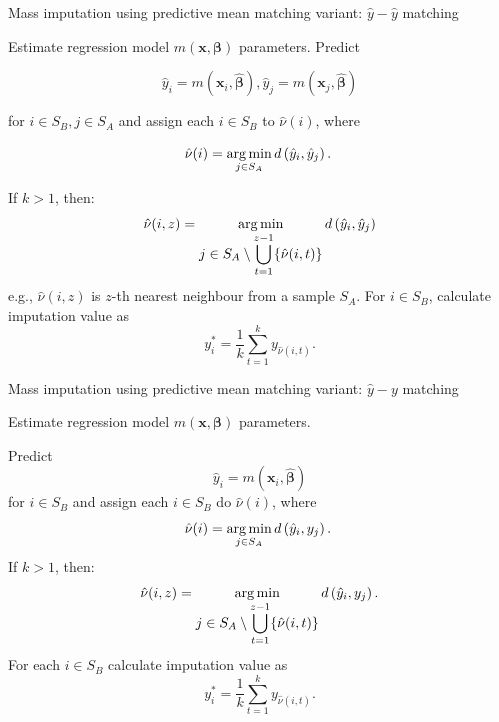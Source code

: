 \documentclass[
]{jss}
\begin{document}
\begin{algorithm}[ht!]
\caption{Mass imputation using predictive mean matching variant: $\hat{y}-\hat{y}$ matching}
\label{algo-3}
\begin{algorithmic}[1]
\State Estimate regression model $m(\boldsymbol{x}, \boldsymbol{\beta})$ parameters.\;
\State Predict 

$$\hat{y}_{i}=m\left(\boldsymbol{x}_{i},\hat{\boldsymbol{\beta}}\right),  \hat{y}_{j}=m\left(\boldsymbol{x}_{j},\hat{\boldsymbol{\beta}}\right)$$

for $i\in S_{B}, j\in S_{A}$ and assign each  $i\in S_{B}$ to $\hat{\nu}(i)$, where

$$
\displaystyle \hat{\nu}(i)=
\operatornamewithlimits{arg\,min}_{j\in S_{A}}d\left(\hat{y}_{i},\hat{y}_{j}\right).\;
$$ 

\State If $k>1$, then:
$$
\hat{\nu}(i, z) = \operatornamewithlimits{arg\,min}_{\displaystyle j\in S_{A}\setminus\bigcup_{t=1}^{z-1}
\{\hat{\nu}(i, t)\}} d\left(\hat{y}_{i},\hat{y}_{j}\right)
$$
e.g., $\hat{\nu}(i, z)$ is $z$-th nearest neighbour from a sample $S_A$.\;
\State For $i \in S_B$, calculate imputation value as 
$$
y_i^* = \frac{1}{k}\sum_{t=1}^{k}y_{\hat{\nu}(i, t)}.
$$
\end{algorithmic}
\end{algorithm}

\begin{algorithm}[ht!]
\caption{Mass imputation using predictive mean matching variant: $\hat{y}-y$ matching}
\label{algo-4}
\begin{algorithmic}[1]

\State Estimate regression model $m(\boldsymbol{x}, \boldsymbol{\beta})$ parameters.\;

\State Predict 
$$
\hat{y}_{i}=m\left(\boldsymbol{x}_{i},\hat{\boldsymbol{\beta}}\right)
$$  for $i \in S_{B}$ 
and assign each  $i \in S_{B}$ do $\hat{\nu}(i)$, where
$$
\displaystyle \hat{\nu}(i)=
\operatornamewithlimits{arg\,min}_{j \in S_{A}}d\left(\hat{y}_{i},y_{j}\right).\;
$$
\State If $k>1$, then:
$$
\hat{\nu}(i, z) = \operatornamewithlimits{arg\,min}_{\displaystyle j \in S_{A} \setminus \bigcup_{t=1}^{z-1}
\{\hat{\nu}(i, t)\}} d\left(\hat{y}_{i},y_{j}\right).
$$
\State For each $i \in S_B$ calculate imputation value as
$$
y_i^* = \frac{1}{k}\sum_{t=1}^{k}y_{\hat{\nu}(i, t)}.
$$
\end{algorithmic}
\end{algorithm}

\newpage


\end{document}
